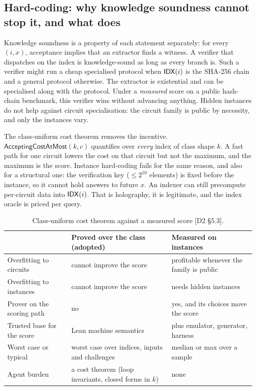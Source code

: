 \subsection{Hard-coding: why knowledge soundness cannot stop it, and what does}\label{subsec:bench-hardcode}

Knowledge soundness is a property of each statement separately: for every $(i,x)$, acceptance implies
that an extractor finds a witness. A verifier that dispatches on the index is knowledge-sound as long
as every branch is. Such a verifier might run a cheap specialised protocol when $\mathsf{IDX}(i)$ is the
SHA-256 chain and a general protocol otherwise. The extractor is existential and can be specialised
along with the protocol. Under a \emph{measured} score on a public hash-chain benchmark, this verifier
wins without advancing anything. Hidden instances do not help against circuit specialisation: the
circuit family is public by necessity, and only the instances vary.

The class-uniform cost theorem removes the incentive. $\mathsf{AcceptingCostAtMost}(k,c)$ quantifies over
\emph{every} index of class shape $k$. A fast path for one circuit lowers the cost on that circuit
but not the maximum, and the maximum is the score. Instance hard-coding fails for the same reason,
and also for a structural one: the verification key ($\le2^{10}$ elements) is fixed before the
instance, so it cannot hold answers to future $x$. An indexer can still precompute per-circuit data
into $\mathsf{IDX}(i)$. That is holography, it is legitimate, and the index oracle is priced per query.

\begin{table}[t]
\centering\small
\begin{tabularx}{\linewidth}{@{}>{\raggedright\arraybackslash}p{3.2cm}>{\raggedright\arraybackslash}X>{\raggedright\arraybackslash}X@{}}
\toprule
& Proved over the class (adopted) & Measured on instances \\
\midrule
Overfitting to circuits & cannot improve the score & profitable whenever the family is public \\
Overfitting to instances & cannot improve the score & needs hidden instances \\
Prover on the scoring path & no & yes, and its choices move the score \\
Trusted base for the score & Lean machine semantics & plus emulator, generator, harness \\
Worst case or typical & worst case over indices, inputs and challenges & median or max over a sample \\
Agent burden & a cost theorem (loop invariants, closed forms in $k$) & none \\
\bottomrule
\end{tabularx}
\caption{Class-uniform cost theorem against a measured score [D2 §5.3].}
\label{tab:bench-proved}
\end{table}

